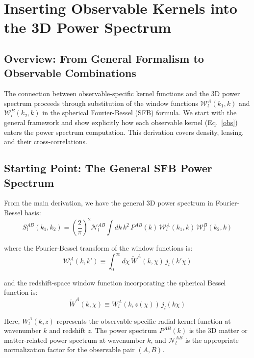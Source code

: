 \section{Inserting Observable Kernels into the 3D Power Spectrum}

\subsection{Overview: From General Formalism to Observable Combinations}

The connection between observable-specific kernel functions and the 3D power spectrum proceeds through substitution of the window functions $\mathcal{W}_l^A(k_1, k)$ and $\mathcal{W}_l^B(k_2, k)$ in the spherical Fourier-Bessel (SFB) formula. We start with the general framework and show explicitly how each observable kernel (Eq.~\ref{obs}) enters the power spectrum computation. This derivation covers density, lensing, and their cross-correlations.

\subsection{Starting Point: The General SFB Power Spectrum}

From the main derivation, we have the general 3D power spectrum in Fourier-Bessel basis:
\begin{equation}
\label{eq:sfb_general}
S_l^{AB}(k_1,k_2) = \left(\frac{2}{\pi}\right)^2 \mathcal{N}_l^{AB} \int dk \, k^2 \, P^{AB}(k) \, \mathcal{W}_l^A(k_1, k) \, \mathcal{W}_l^B(k_2, k)
\end{equation}

where the Fourier-Bessel transform of the window functions is:
\begin{equation}
\label{eq:window_fb_transform}
\mathcal{W}_l^{A}(k, k') \equiv \int_0^{\infty} d\chi \, \widetilde{W}^{A}(k, \chi) \, j_l(k' \chi)
\end{equation}

and the redshift-space window function incorporating the spherical Bessel function is:
\begin{equation}
\label{eq:window_weighted}
\widetilde{W}^{A}(k, \chi) \equiv W^{A}_l(k, z(\chi)) \, j_l(k \chi)
\end{equation}

Here, $W^{A}_l(k, z)$ represents the observable-specific radial kernel function at wavenumber $k$ and redshift $z$. The power spectrum $P^{AB}(k)$ is the 3D matter or matter-related power spectrum at wavenumber $k$, and $\mathcal{N}_l^{AB}$ is the appropriate normalization factor for the observable pair $(A, B)$.

